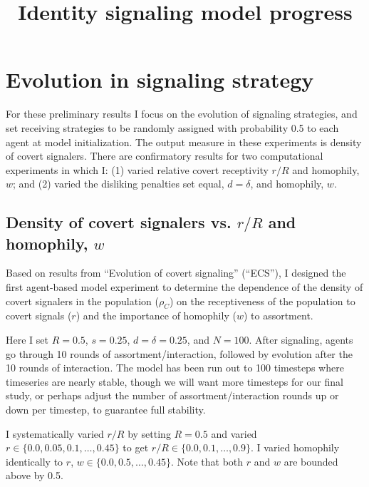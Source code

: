 \documentclass[11pt,letterpaper]{article}
\title{\vspace{-1in}Identity signaling model progress}
\author{} %
\begin{document}
\maketitle

\section*{Evolution in signaling strategy}

For these preliminary results I focus on the evolution of signaling strategies,
and set receiving strategies to be randomly assigned with probability 0.5 to
each agent at model initialization. The output measure in these experiments
is density of covert signalers. There are confirmatory results for two
computational experiments in which I: (1) varied relative covert receptivity $r/R$ and 
homophily, $w$; and (2) varied the disliking penalties set equal, $d=\delta$,
and homophily, $w$.

\subsection*{Density of covert signalers vs. $r/R$ and homophily, $w$}

Based on results from ``Evolution of covert signaling'' (``ECS''), I designed
the first agent-based model experiment to determine the dependence of the
density of covert signalers in the population ($\rho_C$) on
the receptiveness of the population to covert signals ($r$) and the
importance of homophily ($w$) to assortment. 

Here I set $R=0.5$, $s=0.25$, $d=\delta=0.25$,
and $N=100$. After signaling, agents go through 10 rounds of assortment/interaction,
followed by evolution after the 10 rounds of interaction. The model has been
run out to 100 timesteps where timeseries are nearly stable, though we will
want more timesteps for our final study, or perhaps adjust the number of 
assortment/interaction rounds up or down per timestep, to guarantee full 
stability.

I systematically varied $r/R$ by setting $R=0.5$ and varied 
$r \in \{0.0, 0.05, 0.1, \ldots, 0.45\}$ to get $r/R \in \{0.0, 0.1, \ldots, 0.9\}$.
I varied homophily identically to $r$, $w \in \{0.0, 0.5, \ldots, 0.45\}$. Note
that both $r$ and $w$ are bounded above by 0.5.
\end{document}
